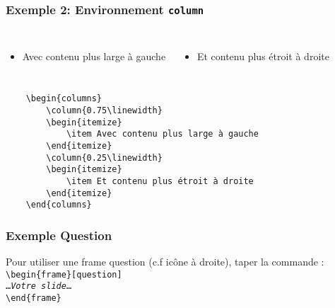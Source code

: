 \documentclass[aspectratio=169]{beamer}
\begin{document}
\begin{frame}[fragile]
    \frametitle{Exemple 2: Environnement \texttt{column}}
    \begin{columns}
        \begin{itemize}
            \item Avec contenu plus large à gauche
        \end{itemize}
        \begin{itemize}
            \item Et contenu plus étroit à droite 
        \end{itemize}
    \end{columns}
{\scriptsize
\begin{verbatim}
    \begin{columns}
        \column{0.75\linewidth}
        \begin{itemize}
            \item Avec contenu plus large à gauche
        \end{itemize}
        \column{0.25\linewidth}
        \begin{itemize}
            \item Et contenu plus étroit à droite 
        \end{itemize}
    \end{columns}
\end{verbatim}
}
\end{frame}

\begin{frame}[question]
    \frametitle{Exemple \og Question\fg}

Pour utiliser une frame question (c.f icône à droite), taper la commande :
\noindent\texttt{%
\textbackslash begin\{frame\}[question]\\
\ldots\emph{Votre slide}\ldots\\
\textbackslash end\{frame\}
}
\end{frame}
\end{document}
